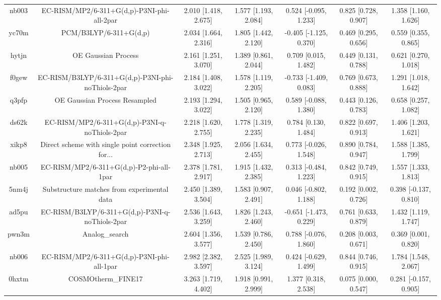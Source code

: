 \documentclass{article}
\begin{document}
\begin{center}
\begin{longtable}{|ccccccc|}
 nb003 &         EC-RISM/MP2/6-311+G(d,p)-P3NI-phi-all-2par &  2.010 [1.418, 2.675] &  1.577 [1.193, 2.084] &    0.524 [-0.095, 1.233] &  0.825 [0.728, 0.907] &   1.358 [1.160, 1.626] \\
 yc70m &                             PCM/B3LYP/6-311+G(d,p) &  2.034 [1.664, 2.316] &  1.805 [1.442, 2.120] &   -0.405 [-1.125, 0.370] &  0.469 [0.295, 0.656] &   0.559 [0.355, 0.865] \\
 hytjn &                                OE Gaussian Process &  2.161 [1.251, 3.070] &  1.389 [0.861, 2.044] &     0.709 [0.015, 1.482] &  0.449 [0.131, 0.788] &   0.621 [0.270, 1.018] \\
 f0gew &  EC-RISM/B3LYP/6-311+G(d,p)-P3NI-phi-noThiols-2par &  2.184 [1.408, 3.022] &  1.578 [1.119, 2.205] &   -0.733 [-1.409, 0.083] &  0.769 [0.673, 0.888] &   1.291 [1.018, 1.642] \\
 q3pfp &                      OE Gaussian Process Resampled &  2.193 [1.294, 3.022] &  1.505 [0.965, 2.120] &    0.589 [-0.088, 1.380] &  0.443 [0.126, 0.783] &   0.658 [0.257, 1.082] \\
 ds62k &      EC-RISM/MP2/6-311+G(d,p)-P3NI-q-noThiols-2par &  2.218 [1.620, 2.755] &  1.778 [1.319, 2.235] &     0.784 [0.130, 1.484] &  0.822 [0.697, 0.913] &   1.406 [1.203, 1.621] \\
 xikp8 &  Direct scheme with single point correction for... &  2.348 [1.925, 2.713] &  2.056 [1.634, 2.455] &    0.773 [-0.026, 1.548] &  0.890 [0.784, 0.947] &   1.588 [1.385, 1.799] \\
 nb005 &           EC-RISM/MP2/6-311+G(d,p)-P2-phi-all-1par &  2.378 [1.781, 2.917] &  1.915 [1.432, 2.385] &    0.313 [-0.484, 1.223] &  0.842 [0.749, 0.915] &   1.557 [1.333, 1.813] \\
 5nm4j &        Substructure matches from experimental data &  2.450 [1.389, 3.504] &  1.583 [0.907, 2.491] &    0.046 [-0.802, 1.188] &  0.192 [0.002, 0.726] &  0.398 [-0.137, 0.810] \\
 ad5pu &    EC-RISM/B3LYP/6-311+G(d,p)-P3NI-q-noThiols-2par &  2.536 [1.643, 3.259] &  1.826 [1.243, 2.460] &   -0.651 [-1.473, 0.229] &  0.761 [0.633, 0.879] &   1.432 [1.119, 1.747] \\
 pwn3m &                                     Analog\_search &  2.604 [1.356, 3.577] &  1.539 [0.786, 2.450] &    0.788 [-0.076, 1.860] &  0.208 [0.003, 0.671] &   0.369 [0.001, 0.820] \\
 nb006 &         EC-RISM/MP2/6-311+G(d,p)-P3NI-phi-all-1par &  2.982 [2.382, 3.597] &  2.525 [1.989, 3.124] &    0.424 [-0.629, 1.499] &  0.844 [0.746, 0.915] &   1.784 [1.548, 2.067] \\
 0hxtm &                                 COSMOtherm\_FINE17 &  3.263 [1.719, 4.402] &  1.918 [0.991, 2.999] &     1.377 [0.318, 2.538] &  0.075 [0.000, 0.547] &  0.281 [-0.157, 0.905] \\
\end{longtable}
\end{center}
\end{document}
